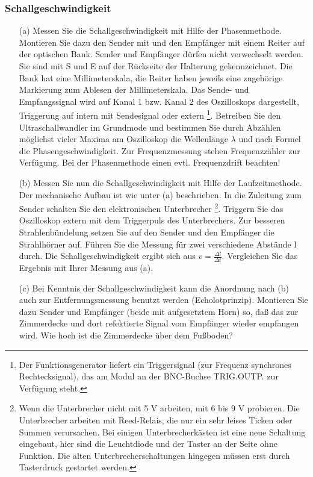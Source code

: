 \documentclass[12pt]{scrartcl}
\begin{document}
\subsubsection{Schallgeschwindigkeit}
\begin{itemize}
\item[(a)]
Messen Sie die Schallgeschwindigkeit mit Hilfe der Phasenmethode. Montieren Sie dazu den Sender mit und den Empfänger mit einem Reiter auf der optischen Bank. Sender und Empfänger dürfen nicht verwechselt werden. Sie sind mit S und E auf der Rückseite der Halterung gekennzeichnet. Die Bank hat eine Millimeterskala, die Reiter haben
jeweils eine zugehörige Markierung zum Ablesen der Millimeterskala. Das Sende- und Empfangssignal wird auf Kanal 1 bzw. Kanal 2 des Oszilloskops dargestellt, Triggerung auf intern mit Sendesignal oder extern
\footnote{Der Funktionsgenerator liefert ein Triggersignal (zur Frequenz synchrones Rechtecksignal), das am Modul an der BNC-Buchse TRIG.OUTP. zur Verfügung steht.}. Betreiben Sie den Ultraschallwandler im Grundmode und bestimmen Sie durch Abzählen möglichst vieler Maxima am Oszilloskop die Wellenlänge $\lambda$
und nach Formel
die Phasengeschwindigkeit.
Zur Frequenzmessung stehen Frequenzzähler zur Verfügung. Bei der Phasenmethode einen evtl. Frequenzdrift beachten!
\item[(b)]
Messen Sie nun die Schallgeschwindigkeit mit Hilfe der Laufzeitmethode. Der mechanische Aufbau ist wie unter (a) beschrieben. In die Zuleitung zum Sender schalten Sie den elektronischen Unterbrecher \footnote{Wenn die Unterbrecher nicht mit 5 V arbeiten, mit 6 bis 9 V probieren. Die Unterbrecher arbeiten mit Reed-Relais, die nur ein sehr leises Ticken oder Summen verursachen. Bei einigen Unterbrecherkästen ist eine neue Schaltung eingebaut, hier sind die Leuchtdiode und der Taster an der Seite ohne Funktion. Die alten Unterbrecherschaltungen hingegen müssen erst durch Tasterdruck gestartet werden.}. Triggern Sie das Oszilloskop extern mit dem Triggerpuls des Unterbrechers. Zur besseren Strahlenbündelung setzen Sie auf den Sender und den Empfänger die Strahlhörner auf. Führen Sie die Messung für zwei verschiedene Abstände
l durch. Die Schallgeschwindigkeit ergibt sich aus $v = \frac{\Delta l}{\Delta t}$. Vergleichen Sie das Ergebnis mit Ihrer Messung aus (a).
\item[(c)]
Bei Kenntnis der Schallgeschwindigkeit kann die Anordnung nach (b) auch zur Entfernungsmessung benutzt werden (Echolotprinzip). Montieren Sie dazu Sender und Empfänger (beide mit aufgesetztem Horn) so, daß das zur Zimmerdecke und dort refektierte Signal vom Empfänger wieder empfangen wird. Wie hoch ist die Zimmerdecke über dem Fußboden?
\end{itemize}
\end{document}
